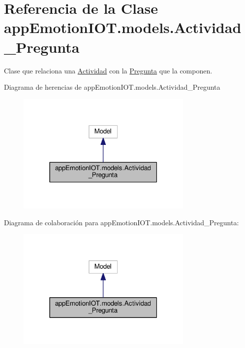 \hypertarget{classappEmotionIOT_1_1models_1_1Actividad__Pregunta}{}\section{Referencia de la Clase app\+Emotion\+I\+O\+T.\+models.\+Actividad\+\_\+\+Pregunta}
\label{classappEmotionIOT_1_1models_1_1Actividad__Pregunta}


Clase que relaciona una \hyperlink{classappEmotionIOT_1_1models_1_1Actividad}{Actividad} con la \hyperlink{classappEmotionIOT_1_1models_1_1Pregunta}{Pregunta} que la componen.  




Diagrama de herencias de app\+Emotion\+I\+O\+T.\+models.\+Actividad\+\_\+\+Pregunta
\nopagebreak
\begin{figure}[H]
\begin{center}
\leavevmode
\includegraphics[width=243pt]{classappEmotionIOT_1_1models_1_1Actividad__Pregunta__inherit__graph}
\end{center}
\end{figure}


Diagrama de colaboración para app\+Emotion\+I\+O\+T.\+models.\+Actividad\+\_\+\+Pregunta\+:
\nopagebreak
\begin{figure}[H]
\begin{center}
\leavevmode
\includegraphics[width=243pt]{classappEmotionIOT_1_1models_1_1Actividad__Pregunta__coll__graph}
\end{center}
\end{figure}
